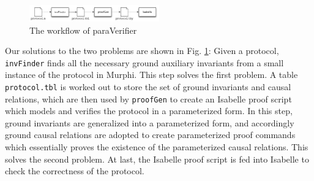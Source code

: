 \documentclass[final]{IEEEtran}
\begin{document}
\begin{figure}[htbp]
\centering %
\includegraphics[width=0.5\textwidth]{paraVerifier.pdf}
\vspace{-0.6cm}
\caption{The workflow of {\sf paraVerifier} \label{fig:arch}
}
\end{figure}

Our solutions to the two problems are shown in Fig. \ref{fig:arch}:
Given a protocol,  \texttt{invFinder} finds all the necessary ground auxiliary invariants from a small instance of the protocol in Murphi. This step solves the first  problem.
 A table {\tt protocol.tbl} is worked out  to store the set of ground invariants and
 causal relations, which are then  used by {\tt proofGen} to
create an Isabelle proof   script which models and verifies the
protocol in a parameterized form. In this step, ground invariants
are generalized into a parameterized form, and accordingly
ground causal relations are adopted to create parameterized
proof commands which essentially proves the existence of the
parameterized causal relations. This solves the second problem.  At last, the Isabelle proof script is
fed into Isabelle to check the correctness of the protocol.
\end{document}
